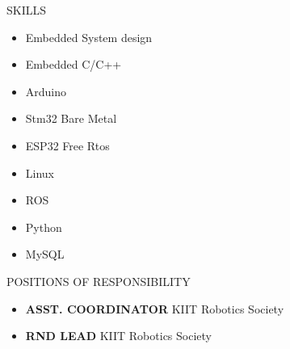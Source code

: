 \documentclass{resume} %
\newcommand{\ExternalLink}{%
    \tikz[x=1.2ex, y=1.2ex, baseline=-0.05ex]{%
        \begin{scope}[x=1ex, y=1ex]
            \clip (-0.1,-0.1) 
                --++ (-0, 1.2) 
                --++ (0.6, 0) 
                --++ (0, -0.6) 
                --++ (0.6, 0) 
                --++ (0, -1);
            \path[draw, 
                line width = 0.5, 
                rounded corners=0.5] 
                (0,0) rectangle (1,1);
        \end{scope}
        \path[draw, line width = 0.5] (0.5, 0.5) 
            -- (1, 1);
        \path[draw, line width = 0.5] (0.6, 1) 
            -- (1, 1) -- (1, 0.6);
        }
    }
\begin{document}
\begin{rSection}{SKILLS}
    \begin{multicols}{3}
    \begin{itemize}
        \item Embedded System design        
        \item Embedded C/C++
        \item Arduino                                       
        \item Stm32 Bare Metal
        \item ESP32 Free Rtos 
        \item Linux
        \item ROS
        \item Python
        \item MySQL
    \end{itemize}
    \end{multicols}
\end{rSection}
\begin{rSection}{POSITIONS OF RESPONSIBILITY}
\begin{itemize}
    \item	\textbf{ASST. COORDINATOR} {KIIT Robotics Society}
    \item	\textbf{RND LEAD} {KIIT Robotics Society}
\end{itemize}
\end{rSection}

\end{document}
